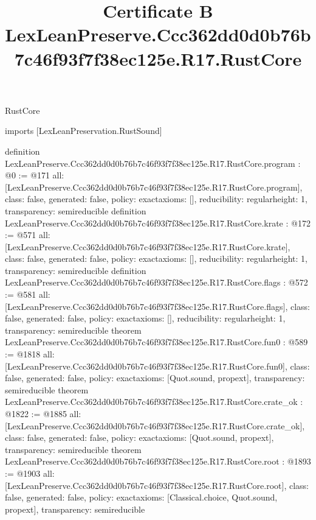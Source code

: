 \begin{lexlean}{RustCore}
\title{Certificate B LexLeanPreserve.Ccc362dd0d0b76b7c46f93f7f38ec125e.R17.RustCore}
\begin{coremodule}
imports [LexLeanPreservation.RustSound]

definition LexLeanPreserve.Ccc362dd0d0b76b7c46f93f7f38ec125e.R17.RustCore.program : @0 := @171 {
  all: [LexLeanPreserve.Ccc362dd0d0b76b7c46f93f7f38ec125e.R17.RustCore.program],
  class: false,
  generated: false,
  policy: exact{axioms: []},
  reducibility: regular{height: 1},
  transparency: semireducible
}
definition LexLeanPreserve.Ccc362dd0d0b76b7c46f93f7f38ec125e.R17.RustCore.krate : @172 := @571 {
  all: [LexLeanPreserve.Ccc362dd0d0b76b7c46f93f7f38ec125e.R17.RustCore.krate],
  class: false,
  generated: false,
  policy: exact{axioms: []},
  reducibility: regular{height: 1},
  transparency: semireducible
}
definition LexLeanPreserve.Ccc362dd0d0b76b7c46f93f7f38ec125e.R17.RustCore.flags : @572 := @581 {
  all: [LexLeanPreserve.Ccc362dd0d0b76b7c46f93f7f38ec125e.R17.RustCore.flags],
  class: false,
  generated: false,
  policy: exact{axioms: []},
  reducibility: regular{height: 1},
  transparency: semireducible
}
theorem LexLeanPreserve.Ccc362dd0d0b76b7c46f93f7f38ec125e.R17.RustCore.fun0 : @589 := @1818 {
  all: [LexLeanPreserve.Ccc362dd0d0b76b7c46f93f7f38ec125e.R17.RustCore.fun0],
  class: false,
  generated: false,
  policy: exact{axioms: [Quot.sound, propext]},
  transparency: semireducible
}
theorem LexLeanPreserve.Ccc362dd0d0b76b7c46f93f7f38ec125e.R17.RustCore.crate_ok : @1822 := @1885 {
  all: [LexLeanPreserve.Ccc362dd0d0b76b7c46f93f7f38ec125e.R17.RustCore.crate_ok],
  class: false,
  generated: false,
  policy: exact{axioms: [Quot.sound, propext]},
  transparency: semireducible
}
theorem LexLeanPreserve.Ccc362dd0d0b76b7c46f93f7f38ec125e.R17.RustCore.root : @1893 := @1903 {
  all: [LexLeanPreserve.Ccc362dd0d0b76b7c46f93f7f38ec125e.R17.RustCore.root],
  class: false,
  generated: false,
  policy: exact{axioms: [Classical.choice, Quot.sound, propext]},
  transparency: semireducible
}


\end{coremodule}
\end{lexlean}
